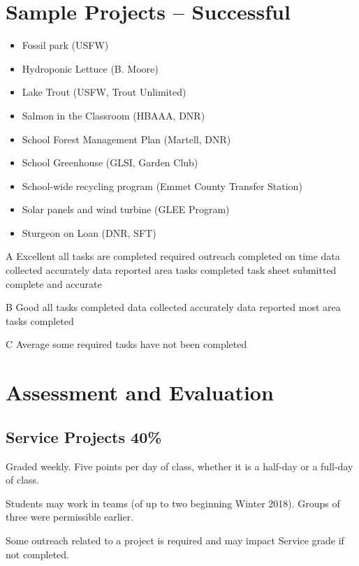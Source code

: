\documentclass[letterpaper,10pt]{memoir}
\begin{document}
\section*{Sample Projects -- Successful}
\begin{itemize}
\item Fossil park (USFW)
\item Hydroponic Lettuce (B. Moore)
\item Lake Trout (USFW, Trout Unlimited)
\item Salmon in the Classroom (HBAAA, DNR)
\item School Forest Management Plan (Martell, DNR)
\item School Greenhouse (GLSI, Garden Club)
\item School-wide recycling program (Emmet County Transfer Station)
\item Solar panels and wind turbine (GLEE Program)
\item Sturgeon on Loan (DNR, SFT)
\end{itemize}

 

\newpage
	

A	Excellent
all tasks are completed
required outreach completed on time
data collected accurately
data reported
area tasks completed
task sheet submitted complete and accurate


B	Good
all tasks completed
data collected accurately
data reported
most area tasks completed


C Average
some required tasks have not been completed



\newpage
\section*{Assessment and Evaluation}


	\subsection*{Service Projects \hfill 40\%}

	Graded weekly.	Five points per day of class, whether it is a half-day or a full-day of class.

	Students may work in teams (of up to two beginning Winter 2018). Groups of three were permissible earlier.

	Some outreach related to a project is required and may impact Service grade if not completed.
\end{document}
